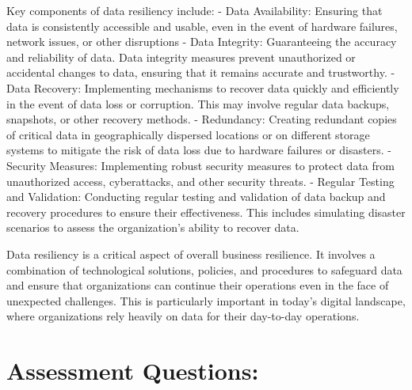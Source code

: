 \documentclass[
  letterpaper,
  DIV=11,
  numbers=noendperiod]{scrreprt}
\begin{document}
Key components of data resiliency include: - Data Availability: Ensuring
that data is consistently accessible and usable, even in the event of
hardware failures, network issues, or other disruptions - Data
Integrity: Guaranteeing the accuracy and reliability of data. Data
integrity measures prevent unauthorized or accidental changes to data,
ensuring that it remains accurate and trustworthy. - Data Recovery:
Implementing mechanisms to recover data quickly and efficiently in the
event of data loss or corruption. This may involve regular data backups,
snapshots, or other recovery methods. - Redundancy: Creating redundant
copies of critical data in geographically dispersed locations or on
different storage systems to mitigate the risk of data loss due to
hardware failures or disasters. - Security Measures: Implementing robust
security measures to protect data from unauthorized access,
cyberattacks, and other security threats. - Regular Testing and
Validation: Conducting regular testing and validation of data backup and
recovery procedures to ensure their effectiveness. This includes
simulating disaster scenarios to assess the organization's ability to
recover data.

Data resiliency is a critical aspect of overall business resilience. It
involves a combination of technological solutions, policies, and
procedures to safeguard data and ensure that organizations can continue
their operations even in the face of unexpected challenges. This is
particularly important in today's digital landscape, where organizations
rely heavily on data for their day-to-day operations.

\section{Assessment Questions:}\label{assessment-questions-2}
\end{document}
